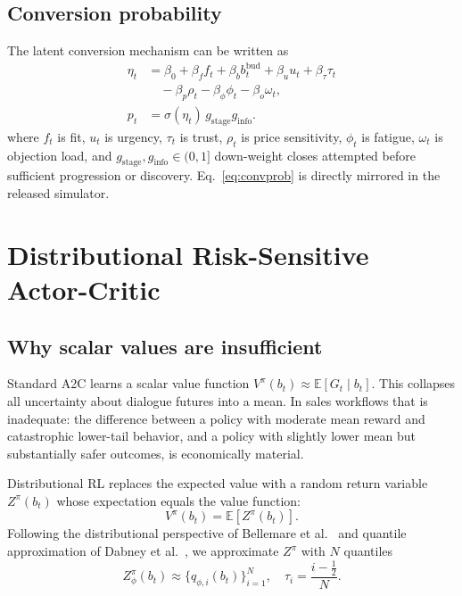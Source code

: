 \documentclass[conference]{IEEEtran}
\newcommand{\E}{\mathbb{E}}
\begin{document}
\subsection{Conversion probability}
The latent conversion mechanism can be written as
\begin{align}
\eta_t
&=
\beta_0 + \beta_f f_t + \beta_b b_t^{\mathrm{bud}} + \beta_u u_t + \beta_\tau \tau_t \nonumber\\
&\quad
- \beta_p \rho_t - \beta_\phi \phi_t - \beta_o \omega_t,
\label{eq:convlogit}\\
p_t
&=
\sigma(\eta_t)\, g_{\mathrm{stage}} g_{\mathrm{info}} .
\label{eq:convprob}
\end{align}
where \(f_t\) is fit, \(u_t\) is urgency, \(\tau_t\) is trust, \(\rho_t\) is price sensitivity, \(\phi_t\) is fatigue, \(\omega_t\) is objection load, and \(g_{\mathrm{stage}}, g_{\mathrm{info}}\in(0,1]\) down-weight closes attempted before sufficient progression or discovery. Eq.~\eqref{eq:convprob} is directly mirrored in the released simulator.

\section{Distributional Risk-Sensitive Actor-Critic}
\subsection{Why scalar values are insufficient}
Standard A2C learns a scalar value function \(V^\pi(b_t)\approx \E[G_t\mid b_t]\). This collapses all uncertainty about dialogue futures into a mean. In sales workflows that is inadequate: the difference between a policy with moderate mean reward and catastrophic lower-tail behavior, and a policy with slightly lower mean but substantially safer outcomes, is economically material.

Distributional RL replaces the expected value with a random return variable \(Z^\pi(b_t)\) whose expectation equals the value function:
\begin{equation}
V^\pi(b_t)=\E[Z^\pi(b_t)].
\end{equation}
Following the distributional perspective of Bellemare et al.~\cite{bellemare2017distributional} and quantile approximation of Dabney et al.~\cite{dabney2018quantile}, we approximate \(Z^\pi\) with \(N\) quantiles
\begin{equation}
Z^\pi_\phi(b_t) \approx \{q_{\phi,i}(b_t)\}_{i=1}^N,
\quad
\tau_i=\frac{i-\frac{1}{2}}{N}.
\end{equation}
\end{document}
